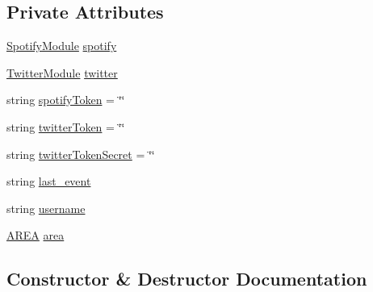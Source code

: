 \subsection*{Private Attributes}
\begin{DoxyCompactItemize}
\item 
\mbox{\hyperlink{classArea_1_1Models_1_1SpotifyModule}{Spotify\+Module}} \mbox{\hyperlink{classArea_1_1Models_1_1TwitterSpotifyArea_ab62cebf1d64d1e0228339d18f59ffe72}{spotify}}
\item 
\mbox{\hyperlink{classArea_1_1Models_1_1TwitterModule}{Twitter\+Module}} \mbox{\hyperlink{classArea_1_1Models_1_1TwitterSpotifyArea_af0e2ef8e1068fa52491e9a8d032c0e43}{twitter}}
\item 
string \mbox{\hyperlink{classArea_1_1Models_1_1TwitterSpotifyArea_aee7f141510690771ad3e8688f30439d7}{spotify\+Token}} = \char`\"{}\char`\"{}
\item 
string \mbox{\hyperlink{classArea_1_1Models_1_1TwitterSpotifyArea_a5f52a64b89e8370e96ca7776d1acd30c}{twitter\+Token}} = \char`\"{}\char`\"{}
\item 
string \mbox{\hyperlink{classArea_1_1Models_1_1TwitterSpotifyArea_afe22e0ccff33b59889bf52838818d2fb}{twitter\+Token\+Secret}} = \char`\"{}\char`\"{}
\item 
string \mbox{\hyperlink{classArea_1_1Models_1_1TwitterSpotifyArea_ab916a648d3fb2b67bb26c954989032aa}{last\+\_\+event}}
\item 
string \mbox{\hyperlink{classArea_1_1Models_1_1TwitterSpotifyArea_a08144e22ff5cd628395959a2f0e91f29}{username}}
\item 
\mbox{\hyperlink{classArea_1_1Models_1_1AREA}{A\+R\+EA}} \mbox{\hyperlink{classArea_1_1Models_1_1TwitterSpotifyArea_a85693ce9a136d23f93e0ed9d5802846c}{area}}
\end{DoxyCompactItemize}


\subsection{Constructor \& Destructor Documentation}
\mbox{\label{classArea_1_1Models_1_1TwitterSpotifyArea_a48e34b1cad5cc6e5049972bdcccfe385}} 
